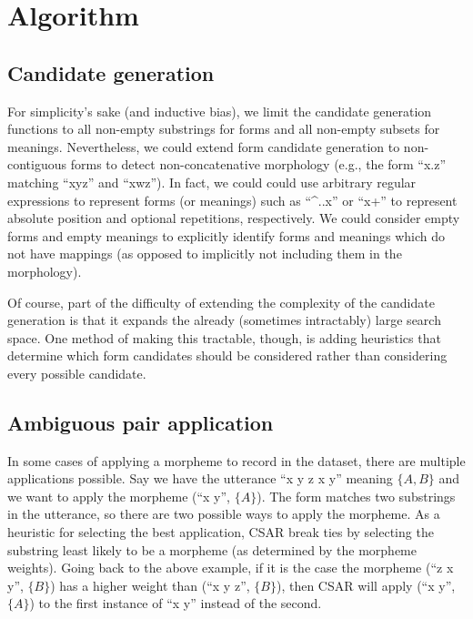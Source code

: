 
\section{Algorithm}%
\label{app:alg}

\subsection{Candidate generation}%
\label{app:candidate}

For simplicity's sake (and inductive bias), we limit the candidate generation functions to all non-empty substrings for forms and all non-empty subsets for meanings.
Nevertheless, we could extend form candidate generation to non-contiguous forms to detect non-concatenative morphology (e.g., the form ``\mbox{x.z}'' matching ``\mbox{xyz}'' and ``\mbox{xwz}'').
In fact, we could could use arbitrary regular expressions to represent forms (or meanings) such as ``\^{}..x'' or ``x+'' to represent absolute position and optional repetitions, respectively.
We could consider empty forms and empty meanings to explicitly identify forms and meanings which do not have mappings (as opposed to implicitly not including them in the morphology).

Of course, part of the difficulty of extending the complexity of the candidate generation is that it expands the already (sometimes intractably) large search space.
One method of making this tractable, though, is adding heuristics that determine which form candidates should be considered rather than considering every possible candidate.


\subsection{Ambiguous pair application}%
\label{app:ambig-app}

In some cases of applying a morpheme to record in the dataset, there are multiple applications possible.
Say we have the utterance ``x y z x y'' meaning $\{A,B\}$ and we want to apply the morpheme (``x y'', $\{A\}$).
The form matches two substrings in the utterance, so there are two possible ways to apply the morpheme.
As a heuristic for selecting the best application, CSAR break ties by selecting the substring least likely to be a morpheme (as determined by the morpheme weights).
Going back to the above example, if it is the case the morpheme (``z x y'', $\{B\}$) has a higher weight than (``x y z'', $\{B\}$), then CSAR will apply (``x y'', $\{A\}$) to the first instance of ``x y'' instead of the second.

